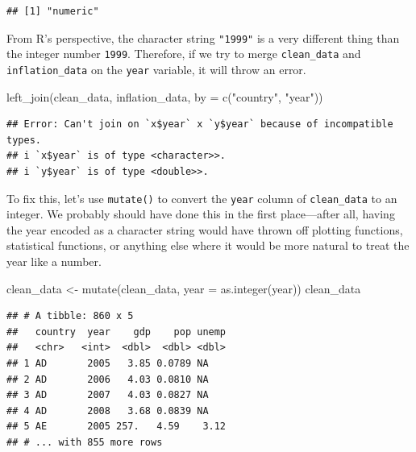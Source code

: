 \documentclass[
  12pt,
  oneside,openany]{book}
\newenvironment{Shaded}{\begin{snugshade}}{\end{snugshade}}
\newcommand{\AttributeTok}[1]{\textcolor[rgb]{0.77,0.63,0.00}{#1}}
\newcommand{\FunctionTok}[1]{\textcolor[rgb]{0.00,0.00,0.00}{#1}}
\newcommand{\NormalTok}[1]{#1}
\newcommand{\OtherTok}[1]{\textcolor[rgb]{0.56,0.35,0.01}{#1}}
\newcommand{\SpecialCharTok}[1]{\textcolor[rgb]{0.00,0.00,0.00}{#1}}
\newcommand{\StringTok}[1]{\textcolor[rgb]{0.31,0.60,0.02}{#1}}
\begin{document}
\begin{Shaded}
\end{Shaded}

\begin{verbatim}
## [1] "numeric"
\end{verbatim}

From R's perspective, the character string \texttt{"1999"} is a very different thing than the integer number \texttt{1999}. Therefore, if we try to merge \texttt{clean\_data} and \texttt{inflation\_data} on the \texttt{year} variable, it will throw an error.

\begin{Shaded}
\begin{Highlighting}[]
\FunctionTok{left\_join}\NormalTok{(clean\_data,}
\NormalTok{          inflation\_data,}
          \AttributeTok{by =} \FunctionTok{c}\NormalTok{(}\StringTok{"country"}\NormalTok{, }\StringTok{"year"}\NormalTok{))}
\end{Highlighting}
\end{Shaded}

\begin{verbatim}
## Error: Can't join on `x$year` x `y$year` because of incompatible types.
## i `x$year` is of type <character>>.
## i `y$year` is of type <double>>.
\end{verbatim}

To fix this, let's use \texttt{mutate()} to convert the \texttt{year} column of \texttt{clean\_data} to an integer. We probably should have done this in the first place---after all, having the year encoded as a character string would have thrown off plotting functions, statistical functions, or anything else where it would be more natural to treat the year like a number.

\begin{Shaded}
\begin{Highlighting}[]
\NormalTok{clean\_data }\OtherTok{\textless{}{-}} \FunctionTok{mutate}\NormalTok{(clean\_data,}
                     \AttributeTok{year =} \FunctionTok{as.integer}\NormalTok{(year))}
\NormalTok{clean\_data}
\end{Highlighting}
\end{Shaded}

\begin{verbatim}
## # A tibble: 860 x 5
##   country  year    gdp    pop unemp
##   <chr>   <int>  <dbl>  <dbl> <dbl>
## 1 AD       2005   3.85 0.0789 NA   
## 2 AD       2006   4.03 0.0810 NA   
## 3 AD       2007   4.03 0.0827 NA   
## 4 AD       2008   3.68 0.0839 NA   
## 5 AE       2005 257.   4.59    3.12
## # ... with 855 more rows
\end{verbatim}
\end{document}
